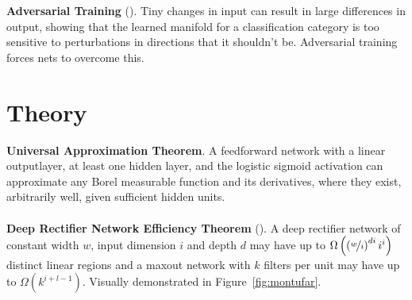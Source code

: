 \documentclass{article}
\begin{document}
\\\\
\noindent
\textbf{Adversarial Training} (). Tiny changes in input can result in large differences in output, showing that the learned manifold for a classification category is too sensitive to perturbations in directions that it shouldn't be. Adversarial training forces nets to overcome this.

\section{Theory}

\noindent
\textbf{Universal Approximation Theorem}. A feedforward network with a linear outputlayer, at least one hidden layer, and the logistic sigmoid activation can approximate any Borel measurable function and its derivatives, where they exist, arbitrarily well, given sufficient hidden units.
\\\\
\noindent
\textbf{Deep Rectifier Network Efficiency Theorem} (). A deep rectifier network of constant width $w$, input dimension $i$ and depth $d$ may have up to $\Omega\left({\left({\nicefrac{w}{i}}\right)^{di}i^i}\right)$ distinct linear regions and a maxout network with $k$ filters per unit may have up to $\Omega(k^{i+l-1})$. Visually demonstrated in Figure~\ref{fig:montufar}.
\end{document}
